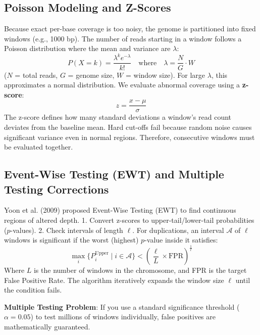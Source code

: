 \documentclass[11pt,a4paper]{article}
\begin{document}

\subsection{Poisson Modeling and Z-Scores}
Because exact per-base coverage is too noisy, the genome is partitioned into fixed windows (e.g., 1000 bp). The number of reads starting in a window follows a Poisson distribution where the mean and variance are $\lambda$:
\[
P(X = k) = \frac{\lambda^k e^{-\lambda}}{k!} \quad \text{where} \quad \lambda = \frac{N}{G} \cdot W
\]
($N$ = total reads, $G$ = genome size, $W$ = window size). For large $\lambda$, this approximates a normal distribution. We evaluate abnormal coverage using a \textbf{z-score}:
\[
z = \frac{x - \mu}{\sigma}
\]
The z-score defines how many standard deviations a window's read count deviates from the baseline mean. Hard cut-offs fail because random noise causes significant variance even in normal regions. Therefore, consecutive windows must be evaluated together.

\subsection{Event-Wise Testing (EWT) and Multiple Testing Corrections}
Yoon et al. (2009) proposed Event-Wise Testing (EWT) to find continuous regions of altered depth. 
1. Convert z-scores to upper-tail/lower-tail probabilities ($p$-values).
2. Check intervals of length $\ell$. For duplications, an interval $\mathcal{A}$ of $\ell$ windows is significant if the worst (highest) $p$-value inside it satisfies:
\[
\max_i \{P_i^{\mathrm{Upper}} \mid i \in \mathcal{A}\} < \left(\frac{\ell}{L} \times \mathrm{FPR}\right)^{\frac{1}{\ell}}
\]
Where $L$ is the number of windows in the chromosome, and FPR is the target False Positive Rate. The algorithm iteratively expands the window size $\ell$ until the condition fails.

\begin{important}
    \textbf{Multiple Testing Problem}: If you use a standard significance threshold ($\alpha=0.05$) to test millions of windows individually, false positives are mathematically guaranteed.
\end{important}
\end{document}
